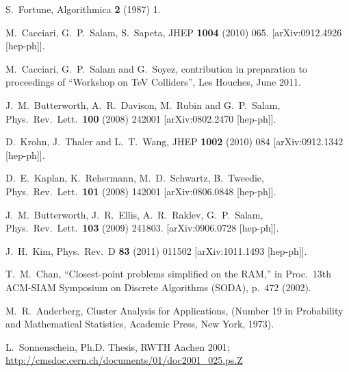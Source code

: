 \documentclass[12pt,a4]{article}
\begin{document}
\begin{thebibliography}{99}
  S.~Fortune,
  Algorithmica {\bf 2} (1987) 1.

  M.~Cacciari, G.~P.~Salam, S.~Sapeta,
  JHEP {\bf 1004 } (2010)  065.
  [arXiv:0912.4926 [hep-ph]].

 M.~Cacciari, G.~P.~Salam and G.~Soyez, contribution in
  preparation to proceedings of ``Workshop on TeV Colliders'', Les
  Houches, June 2011.


  J.~M.~Butterworth, A.~R.~Davison, M.~Rubin and G.~P.~Salam,
  Phys.\ Rev.\ Lett.\  {\bf 100} (2008) 242001
  [arXiv:0802.2470 [hep-ph]].

  D.~Krohn, J.~Thaler and L.~T.~Wang,
  JHEP {\bf 1002} (2010) 084
  [arXiv:0912.1342 [hep-ph]].

  D.~E.~Kaplan, K.~Rehermann, M.~D.~Schwartz, B.~Tweedie,
  Phys.\ Rev.\ Lett.\  {\bf 101 } (2008)  142001
  [arXiv:0806.0848 [hep-ph]].

  J.~M.~Butterworth, J.~R.~Ellis, A.~R.~Raklev, G.~P.~Salam,
  Phys.\ Rev.\ Lett.\  {\bf 103 } (2009)  241803.
  [arXiv:0906.0728 [hep-ph]].

  J.~H.~Kim,
  Phys.\ Rev.\  D {\bf 83} (2011) 011502
  [arXiv:1011.1493 [hep-ph]].


  T.~M.~Chan,
  ``Closest-point problems simplified on the RAM,''
  in Proc.\ 13th ACM-SIAM Symposium on Discrete Algorithms (SODA),
  p.~472 (2002).


  M.~R.~Anderberg, 
  Cluster Analysis for Applications,
  (Number 19 in Probability and Mathematical Statistics, Academic
  Press, New York, 1973).


  L.~Sonnenschein, Ph.D. Thesis, RWTH Aachen 2001; \\
  \url{http://cmsdoc.cern.ch/documents/01/doc2001_025.ps.Z}


\end{thebibliography}
\end{document}
